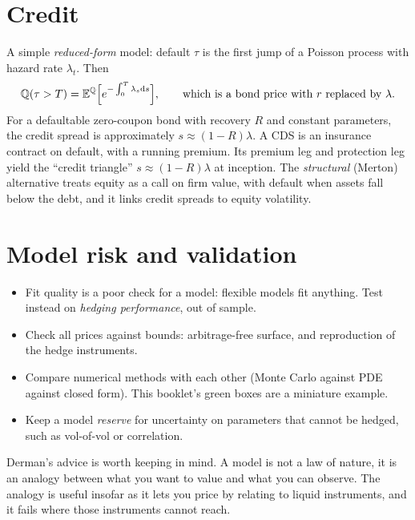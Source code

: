 \section{Credit}

A simple \emph{reduced-form} model: default $\tau$ is the first jump of a Poisson process with hazard rate $\lambda_t$. Then
\[
\mathbb{Q}(\tau>T)=\mathbb{E}^{\mathbb{Q}}\Bigl[e^{-\int_0^T\lambda_s\mathrm{d} s}\Bigr],\qquad\text{which is a bond price with }r\text{ replaced by }\lambda.
\]
For a defaultable zero-coupon bond with recovery $R$ and constant parameters, the credit spread is approximately $s\approx(1-R)\lambda$. A CDS is an insurance contract on default, with a running premium. Its premium leg and protection leg yield the ``credit triangle'' $s\approx(1-R)\lambda$ at inception. The \emph{structural} (Merton) alternative treats equity as a call on firm value, with default when assets fall below the debt, and it links credit spreads to equity volatility.

\section{Model risk and validation}

\begin{itemize}
\item Fit quality is a poor check for a model: flexible models fit anything. Test instead on \emph{hedging performance}, out of sample.
\item Check all prices against bounds: arbitrage-free surface, and reproduction of the hedge instruments.
\item Compare numerical methods with each other (Monte Carlo against PDE against closed form). This booklet's green boxes are a miniature example.
\item Keep a model \emph{reserve} for uncertainty on parameters that cannot be hedged, such as vol-of-vol or correlation.
\end{itemize}

\begin{intuition}
Derman's advice is worth keeping in mind. A model is not a law of nature, it is an analogy between what you want to value and what you can observe. The analogy is useful insofar as it lets you price by relating to liquid instruments, and it fails where those instruments cannot reach.
\end{intuition}

